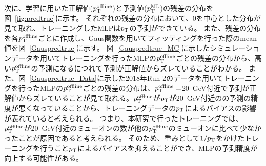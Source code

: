 次に、学習に用いた正解値($p_{\rm{T}}^{\rm{offline}}$)と予測値($p_{\rm{T}}^{\rm{ML}}$)の残差の分布を図~\ref{fig:predtrue}に示す。
それぞれの残差の分布において、0を中心とした分布が見て取れ、トレーニングしたMLPは$p_{\rm{T}}$の予測ができている。
また、残差の分布を各$p_{\rm{T}}^{\rm{offline}}$ごとに作成し、Gaus関数を用いてフィッティングを行った際のmean値を図~\ref{Gauspredtrue}に示す。
図~\ref{Gauspredtrue_MC}に示したシミュレーションデータを用いてトレーニングを行ったMLPの$p_{\rm{T}}^{\rm{offline}}$ごとの残差の分布から、高い$p_{\rm{T}}^{\rm{offline}}$の予測になるにつれて予測が正解値からズレていることがわかる。
また、図~\ref{Gauspredtrue_Data}に示した2018年Run-2のデータを用いてトレーニングを行ったMLPの$p_{\rm{T}}^{\rm{offline}}$ごとの残差の分布は、$p_{\rm{T}}^{\rm{offline}}=$20~GeV付近で予測が正解値からズレていることが見て取れる。$p_{\rm{T}}^{\rm{offline}}$が$p_{\rm{T}}$が20~GeV付近のの予測の精度が悪くなっていることから、トレーニングデータの$p_{\rm{T}}$によるバイアスの影響が表れていると考えられる。
つまり、本研究で行ったトレーニングでは、$p_{\rm{T}}^{\rm{offline}}$が20~GeV付近のミューオンの数が他の$p_{\rm{T}}^{\rm{offline}}$のミューオンに比べて少なかったことが原因であると考えられる。
そのため、重みとして$1/p_{\rm{T}}$をかけたトレーニングを行うこと$p_{\rm{T}}$によるバイアスを抑えることができ、MLPの予測精度が向上する可能性がある。



